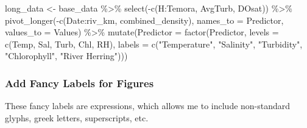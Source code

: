 \documentclass[
]{article}
\newenvironment{Shaded}{\begin{snugshade}}{\end{snugshade}}
\newcommand{\AttributeTok}[1]{\textcolor[rgb]{0.77,0.63,0.00}{#1}}
\newcommand{\FunctionTok}[1]{\textcolor[rgb]{0.00,0.00,0.00}{#1}}
\newcommand{\NormalTok}[1]{#1}
\newcommand{\OtherTok}[1]{\textcolor[rgb]{0.56,0.35,0.01}{#1}}
\newcommand{\SpecialCharTok}[1]{\textcolor[rgb]{0.00,0.00,0.00}{#1}}
\newcommand{\StringTok}[1]{\textcolor[rgb]{0.31,0.60,0.02}{#1}}
\begin{document}
\begin{Shaded}
\begin{Highlighting}[]
\NormalTok{long\_data }\OtherTok{\textless{}{-}}\NormalTok{ base\_data }\SpecialCharTok{\%\textgreater{}\%}
  \FunctionTok{select}\NormalTok{(}\SpecialCharTok{{-}}\FunctionTok{c}\NormalTok{(H}\SpecialCharTok{:}\NormalTok{Temora,  AvgTurb, DOsat)) }\SpecialCharTok{\%\textgreater{}\%}
  \FunctionTok{pivot\_longer}\NormalTok{(}\SpecialCharTok{{-}}\FunctionTok{c}\NormalTok{(Date}\SpecialCharTok{:}\NormalTok{riv\_km, combined\_density), }
               \AttributeTok{names\_to =} \StringTok{\textquotesingle{}Predictor\textquotesingle{}}\NormalTok{, }\AttributeTok{values\_to =} \StringTok{\textquotesingle{}Values\textquotesingle{}}\NormalTok{) }\SpecialCharTok{\%\textgreater{}\%}
  \FunctionTok{mutate}\NormalTok{(}\AttributeTok{Predictor =} \FunctionTok{factor}\NormalTok{(Predictor, }
                            \AttributeTok{levels =} \FunctionTok{c}\NormalTok{(}\StringTok{\textquotesingle{}Temp\textquotesingle{}}\NormalTok{, }\StringTok{\textquotesingle{}Sal\textquotesingle{}}\NormalTok{, }\StringTok{\textquotesingle{}Turb\textquotesingle{}}\NormalTok{,}
                                                  \StringTok{\textquotesingle{}Chl\textquotesingle{}}\NormalTok{, }\StringTok{\textquotesingle{}RH\textquotesingle{}}\NormalTok{),}
                            \AttributeTok{labels =} \FunctionTok{c}\NormalTok{(}\StringTok{"Temperature"}\NormalTok{, }\StringTok{"Salinity"}\NormalTok{, }\StringTok{"Turbidity"}\NormalTok{,}
                                       \StringTok{"Chlorophyll"}\NormalTok{, }\StringTok{"River Herring"}\NormalTok{)))}
\end{Highlighting}
\end{Shaded}

\hypertarget{add-fancy-labels-for-figures}{%
\subsubsection{Add Fancy Labels for
Figures}\label{add-fancy-labels-for-figures}}

These fancy labels are expressions, which allows me to include
non-standard glyphs, greek letters, superscripts, etc.
\end{document}
